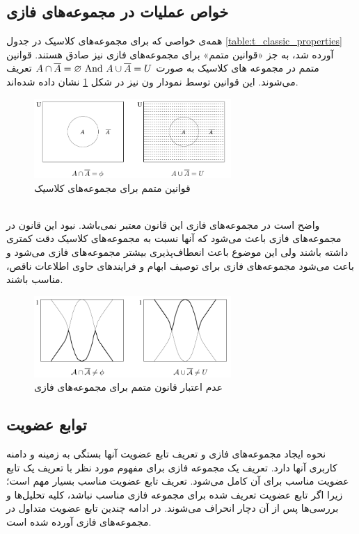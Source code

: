 \documentclass[12pt,a4paper]{article}
\theoremstyle{definition}
\begin{document}
 \subsection{‌خواص عملیات در مجموعه‌های فازی}
همه‌ی خواصی که برای مجموعه‌های کلاسیک در جدول 
\ref{table:t_classic_properties}
آورده شد، به جز «قوانین متمم» برای مجموعه‌های فازی نیز صادق هستند. 
قوانین متمم در مجموعه های کلاسیک به صورت 
$
A \cap \overline{A} = \varnothing {\rm \ And}\ A \cup \overline{A} = U $
تعریف می‌شوند. این قوانین توسط نمودار ون نیز در شکل 
\ref{fig:f_fset_excludedmiddle_classic}
نشان داده شده‌اند. 
\begin{figure}[!htbp]
	\centering 
	\includegraphics[width=75mm]{Images/Fig12.png}
	\vspace{-0.5cm}
	\caption{قوانین متمم برای مجموعه‌های کلاسیک} \label{fig:f_fset_excludedmiddle_classic}
\end{figure}\\
واضح است در مجموعه‌های فازی این قانون معتبر نمی‌باشد. نبود این قانون در مجموعه‌های فازی باعث می‌شود که آنها نسبت به مجموعه‌های کلاسیک دقت کمتری داشته باشند ولی این موضوع باعث انعطاف‌پذیری بیشتر مجموعه‌های فازی می‌شود و باعث می‌شود مجموعه‌های فازی برای توصیف ابهام و فرایندهای حاوی اطلاعات ناقص، مناسب باشند.
\begin{figure}[h]
	\centering 
	\includegraphics[width=75mm]{Images/Fig13.png}
	\vspace{-0.5cm}
	\caption{عدم اعتبار قانون متمم برای مجموعه‌های فازی} \label{fig:f_fset_excludedmiddle_fuzzy}
\end{figure}\cite{Bojadziev2007} 
 \subsection{‌توابع عضویت} 
 نحوه ایجاد مجموعه‌های فازی و تعریف تابع عضویت آنها بستگی به زمینه و دامنه کاربری آنها دارد. تعریف یک مجموعه فازی برای مفهوم مورد نظر با تعریف یک تابع عضویت مناسب برای آن کامل می‌شود. تعریف تابع عضویت مناسب بسیار مهم است؛ زیرا اگر تابع عضویت تعریف شده برای مجموعه فازی مناسب نباشد، کلیه تحلیل‌ها و بررسی‌ها پس از آن دچار انحراف می‌شوند. در ادامه چندین تابع عضویت متداول در مجموعه‌های فازی آورده شده است.
\end{document}
